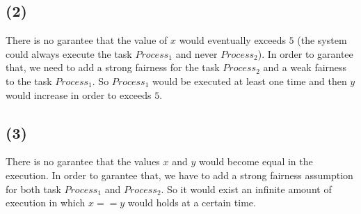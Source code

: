 \documentclass[a4paper,11pt]{report}
\begin{document}
\subsection*{(2)}

There is no garantee that the value of $x$ would eventually exceeds $5$ (the
system could always execute the task $Process_1$ and never $Process_2$). In
order to garantee that, we need to add a strong fairness for the task
$Process_2$ and a weak fairness to the task $Process_1$. So $Process_1$ would be
executed at least one time and then $y$ would increase in order to exceeds $5$.

\subsection*{(3)}

There is no garantee that the values $x$ and $y$ would become equal in the
execution. In order to garantee that, we have to add a strong fairness
assumption for both task $Process_1$ and $Process_2$. So it would exist an
infinite amount of execution in which $x==y$ would holds at a certain time.
\end{document}
